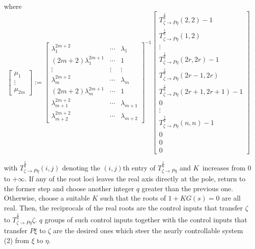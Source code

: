\documentclass[journal,a4paper,12pt,onecolumn]{IEEEtran}
\begin{document}
\begin{itemize}
where\begin{equation}
\left[
\begin{array}{c}
\mu _{1} \\
\vdots \\
\mu _{2m}\end{array}\right] :=\left[
\begin{array}{ccc}
\lambda _{1}^{2m+2} & \cdots & \lambda _{1} \\
\left( 2m+2\right) \lambda _{1}^{2m+1} & \cdots & 1 \\
\vdots & \vdots & \vdots \\
\lambda _{m}^{2m+2} & \cdots & \lambda _{m} \\
\left( 2m+2\right) \lambda _{m}^{2m+1} & \cdots & 1 \\
\lambda _{m+1}^{2m+2} & \cdots & \lambda _{m+1} \\
\lambda _{m+2}^{2m+2} & \cdots & \lambda _{m+2}\end{array}\right] ^{-1}\left[
\begin{array}{c}
T_{\zeta \rightarrow P\eta }^{\frac{1}{q}}\left( 2,2\right) -1 \\
T_{\zeta \rightarrow P\eta }^{\frac{1}{q}}\left( 1,2\right) \\
\vdots \\
T_{\zeta \rightarrow P\eta }^{\frac{1}{q}}\left( 2r,2r\right) -1 \\
T_{\zeta \rightarrow P\eta }^{\frac{1}{q}}\left( 2r-1,2r\right) \\
T_{\zeta \rightarrow P\eta }^{\frac{1}{q}}\left( 2r+1,2r+1\right) -1 \\
0 \\
\vdots \\
T_{\zeta \rightarrow P\eta }^{\frac{1}{q}}\left( n,n\right) -1 \\
0 \\
0 \\
0\end{array}\right]
\end{equation}

with $T_{\zeta \rightarrow P\eta }^{\frac{1}{q}}\left( i,j\right) $ denoting
the $\left( i,j\right) $th entry of $T_{\zeta \rightarrow P\eta }^{\frac{1}{q}}$ and $K$\ increases from $0$ to $+\infty $. If any of the root loci
leaves the real axis directly at the pole, return to the former step and
choose another integer $q$ greater than the previous one. Otherwise, choose
a suitable $K$ such that the roots of $1+KG\left( s\right) =0$ are all real.
Then, the reciprocals of the real roots are the control inputs that transfer
$\zeta $ to $T_{\zeta \rightarrow P\eta }^{\frac{1}{q}}\zeta $. $q$ groups
of such control inputs together with the control inputs that transfer $P\xi $
to $\zeta $ are the desired ones which steer the nearly controllable system
(2) from $\xi $ to $\eta $.
\end{itemize}
\end{document}
